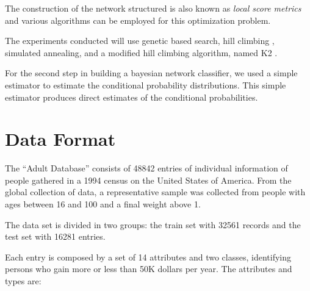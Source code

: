 \documentclass[a4paper]{llncs}
\begin{document}
The construction of the network structured is also known as
\textit{local score metrics} and various algorithms can be employed for this optimization problem.

The experiments conducted will use genetic based search, hill climbing \cite{bayes3}, simulated annealing,
and a modified hill climbing algorithm, named K2 \cite{bayes2}.

For the second step in building a bayesian network classifier, we used a
simple estimator to estimate the conditional probability distributions.
This simple estimator produces
direct estimates of the conditional probabilities. \cite{bayes_weka}

\section{Data Format}

The ``Adult Database'' consists of 48842 entries of individual information of 
people gathered in a 1994 census on the United States of America. From the
global collection of data, a representative sample was collected from people
with ages between 16 and 100 and a final weight above 1.

The data set is divided in two groups: the train set with 32561 records and the test set with 16281 entries.

Each entry is composed by a set of 14 attributes and two classes, identifying
persons who gain more or less than 50K dollars per year. The attributes and types are:
\end{document}
